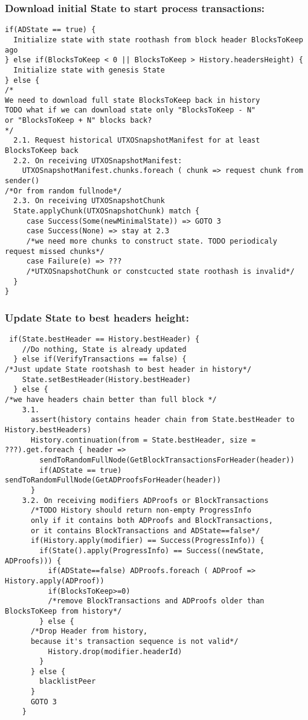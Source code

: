 \documentclass[]{article}   %
\begin{document}
\subsubsection{Download initial State to start process transactions:}
\begin{verbatim}
if(ADState == true) {
  Initialize state with state roothash from block header BlocksToKeep ago
} else if(BlocksToKeep < 0 || BlocksToKeep > History.headersHeight) {
  Initialize state with genesis State
} else {
/*
We need to download full state BlocksToKeep back in history
TODO what if we can download state only "BlocksToKeep - N" 
or "BlocksToKeep + N" blocks back? 
*/
  2.1. Request historical UTXOSnapshotManifest for at least BlocksToKeep back
  2.2. On receiving UTXOSnapshotManifest: 
    UTXOSnapshotManifest.chunks.foreach ( chunk => request chunk from sender()
/*Or from random fullnode*/
  2.3. On receiving UTXOSnapshotChunk
  State.applyChunk(UTXOSnapshotChunk) match {
     case Success(Some(newMinimalState)) => GOTO 3
     case Success(None) => stay at 2.3
     /*we need more chunks to construct state. TODO periodicaly request missed chunks*/
     case Failure(e) => ??? 
     /*UTXOSnapshotChunk or constcucted state roothash is invalid*/  
  }
}
\end{verbatim}
\subsubsection{Update State to best headers height:}
\begin{verbatim}
 if(State.bestHeader == History.bestHeader) {
    //Do nothing, State is already updated
  } else if(VerifyTransactions == false) {
/*Just update State rootshash to best header in history*/
    State.setBestHeader(History.bestHeader)
  } else {
/*we have headers chain better than full block */
    3.1. 
      assert(history contains header chain from State.bestHeader to History.bestHeaders)
      History.continuation(from = State.bestHeader, size = ???).get.foreach { header => 
        sendToRandomFullNode(GetBlockTransactionsForHeader(header))
        if(ADState == true) sendToRandomFullNode(GetADProofsForHeader(header))
      }
    3.2. On receiving modifiers ADProofs or BlockTransactions
      /*TODO History should return non-empty ProgressInfo
      only if it contains both ADProofs and BlockTransactions,
      or it contains BlockTransactions and ADState==false*/
      if(History.apply(modifier) == Success(ProgressInfo)) {
        if(State().apply(ProgressInfo) == Success((newState, ADProofs))) {
          if(ADState==false) ADProofs.foreach ( ADProof => History.apply(ADProof))
          if(BlocksToKeep>=0) 
          /*remove BlockTransactions and ADProofs older than BlocksToKeep from history*/
        } else {
      /*Drop Header from history, 
      because it's transaction sequence is not valid*/
          History.drop(modifier.headerId)
        }
      } else {
        blacklistPeer
      }
      GOTO 3
    }
\end{verbatim}
\end{document}
